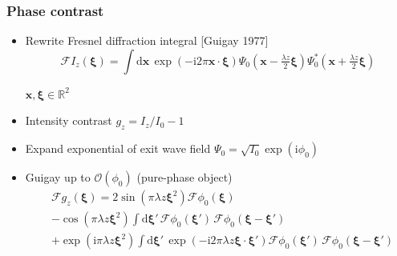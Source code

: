 \documentclass{beamer}
\renewcommand{\vec}{\mathbold}
\newcommand{\vecx}{\vec{x}}
\newcommand{\vecxi}{\vec{\xi}}
\newcommand{\order}{\mathcal{O}}
\newcommand{\R}{\mathbb{R}}
\newcommand{\ii}{\mathrm{i}}
\newcommand{\F}{\mathcal{F}}
\newcommand{\ft}[1]{\widehat{#1}}
\newcommand{\Intd}[1]{\!\mathrm{d}#1\,}
\newcommand{\expp}[1]{\exp\left(#1\right)}
\newcommand{\sref}[1]{{\scriptsize [#1]}}
\newcommand{\flr}[1]{\begin{flushright}{#1}\end{flushright}}
\begin{document}
\begin{frame}
  \frametitle{Phase contrast}
  \begin{itemize}
  \item Rewrite Fresnel diffraction integral \sref{Guigay 1977}
    \begin{equation*}
    \F I_z(\vecxi) = 
    \int \Intd{\vecx}\exp{(-\ii 2\pi\vecx\cdot\vecxi)} 
    \Psi_0\left(\vecx-\tfrac{\lambda z}{2}\vecxi\right) 
    \Psi^*_0\left(\vecx+\tfrac{\lambda z}{2}\vecxi\right)
  \end{equation*}
  \flr{$\vecx,\vecxi \in \R^2$}
\item Intensity contrast $g_z=I_z/I_0-1$
  \item Expand exponential of exit wave field
    $\Psi_0=\sqrt{I_0}\expp{\ii\phi_0}$ 
  \item Guigay up to $\order(\phi_0)$ (pure-phase object)
    \begin{equation*}
      \begin{split}
        &\F g_z(\vecxi) =
        2\sin(\pi\lambda z\vecxi^2)\F \phi_0(\vecxi) 
        \\ & -\cos(\pi\lambda z\vecxi^2)\int\Intd{\vecxi'}
        \F\phi_0(\vecxi')\,\F\phi_0(\vecxi-\vecxi')
        \\ & +\expp{\ii\pi\lambda z\vecxi^2}\int\Intd{\vecxi'}
        \expp{-\ii 2\pi\lambda z\vecxi\cdot\vecxi'} 
        \F\phi_0(\vecxi')\,\F\phi_0(\vecxi-\vecxi')
      \end{split}
    \end{equation*}
  \end{itemize}
\end{frame}
\end{document}
